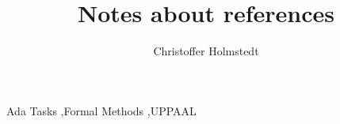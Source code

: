 \documentclass[11pt]{elsarticle}
\begin{document}
    \begin{frontmatter}

        \title{Notes about references}

        \author{Christoffer Holmstedt}
        \address{M\"{a}lardalen University, V\"{a}ster{\aa}s, Sweden \\\today}

        

        \begin{keyword}
            Ada Tasks \sep Formal Methods \sep UPPAAL
        \end{keyword}

    \end{frontmatter}

    
\end{document}
